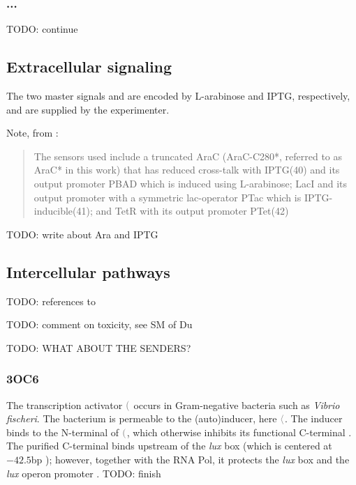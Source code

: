 \documentclass[12pt,notitlepage]{article}
\newcommand{\TODO}[1]{\textrm{\color{red}TODO: #1}}
\newcommand{\cbra}[1]{{\ensuremath{\color{gray}{#1}}}}
\newcommand{\signal}[1]{{{\cbra{\langle}\ce{#1}\cbra{\rangle}}}}
\newcommand{\protein}[1]{{{\cbra{(}\ce{#1}\cbra{)}}}}
\newcommand{\ra}[1]{{\color{Blue}#1}}
\begin{document}

\subsubsection*{...}

\TODO{continue}


\subsection{Extracellular signaling} \label{ss:wAB}


The two master signals  and 
are encoded by L-arabinose and IPTG,
respectively,
and are supplied by the experimenter.


\ra{Note, from \cite[SM, VII.M]{NielsenETAL2016}:
\begin{quote}
    The sensors used include a truncated AraC 
    (AraC-C280*, referred to as AraC* in this work)
    that has reduced cross-talk with IPTG(40) and its output promoter PBAD
    which is induced using L-arabinose; 
    LacI and its output promoter with a symmetric lac-operator PTac which
    is IPTG-inducible(41); 
    and TetR with its output promoter PTet(42)
\end{quote}
}

\TODO{write about Ara and IPTG}



\subsection{Intercellular pathways}

\TODO{references to \cite{DuETAL2020}}

\TODO{comment on toxicity, see SM of Du}

\TODO{WHAT ABOUT THE SENDERS?}


\subsubsection*{3OC6} \label{ss:3OC6}
 
The transcription activator \protein{LuxR}
occurs in Gram-negative bacteria
such as \emph{Vibrio fischeri}.
%
The bacterium is permeable to the (auto)inducer,
here \signal{{3OC6}}.
%
The inducer binds to the N-terminal of \protein{LuxR},
which otherwise inhibits its
functional C-terminal \cite{StevensDolanGreenberg1994}.
%
%
The purified C-terminal binds 
upstream of the \emph{lux} box 
(which is centered at $-42.5$bp \cite{EglandGreenberg1999});
however, 
together with the RNA Pol,
it protects the \emph{lux} box and the \emph{lux} operon
promoter
\cite{StevensDolanGreenberg1994}.
%
\TODO{finish}
\end{document}
